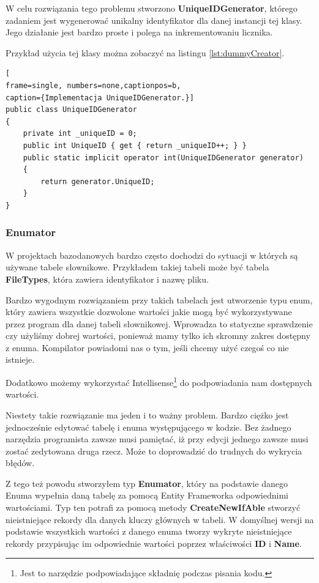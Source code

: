 W celu rozwiązania tego problemu stworzono \textbf{UniqueIDGenerator}, którego zadaniem jest wygenerować unikalny identyfikator dla danej instancji tej klasy. Jego działanie jest bardzo proste i polega na inkrementowaniu licznika.

Przykład użycia tej klasy można zobaczyć na listingu \ref{lst:dummyCreator}.


\begin{minipage}{\linewidth}
\begin{lstlisting}[
frame=single, numbers=none,captionpos=b, 
caption={Implementacja UniqueIDGenerator.}]
public class UniqueIDGenerator
{
	private int _uniqueID = 0;
	public int UniqueID { get { return _uniqueID++; } }
	public static implicit operator int(UniqueIDGenerator generator)
	{
		return generator.UniqueID;
	}
}
\end{lstlisting}
\end{minipage}

\subsubsection{Enumator}

W projektach bazodanowych bardzo często dochodzi do sytuacji w których są używane tabele słownikowe. Przykładem takiej tabeli może być tabela \textbf{FileTypes}, która zawiera identyfikator i nazwę pliku. 

Bardzo wygodnym rozwiązaniem przy takich tabelach jest utworzenie typu enum, który zawiera wszystkie dozwolone wartości jakie mogą być wykorzystywane przez program dla danej tabeli słownikowej. Wprowadza to statyczne sprawdzenie czy użyliśmy dobrej wartości, ponieważ mamy tylko ich skromny zakres dostępny z enuma. Kompilator powiadomi nas o tym, jeśli chcemy użyć czegoś co nie istnieje.

Dodatkowo możemy wykorzystać Intellisense\footnote{Jest to narzędzie podpowiadające składnię podczas pisania kodu.} do podpowiadania nam dostępnych wartości.

\vspace{5mm}

Niestety takie rozwiązanie ma jeden i to ważny problem. Bardzo ciężko jest jednocześnie edytować tabelę i enuma występującego w kodzie. Bez żadnego narzędzia programista zawsze musi pamiętać, iż przy edycji jednego zawsze musi zostać zedytowana druga rzecz. Może to doprowadzić do trudnych do wykrycia błędów.

Z tego też powodu stworzyłem typ \textbf{Enumator}, który na podstawie danego Enuma wypełnia daną tabelę za pomocą Entity Frameworka odpowiednimi wartościami. 	
Typ ten potrafi za pomocą metody \textbf{CreateNewIfAble} stworzyć nieistniejące rekordy dla danych kluczy głównych w tabeli. W domyślnej wersji na podstawie wszystkich wartości z danego enuma tworzy wykryte nieistniejące rekordy przypisując im odpowiednie wartości poprzez właściwości \textbf{ID} i \textbf{Name}.

